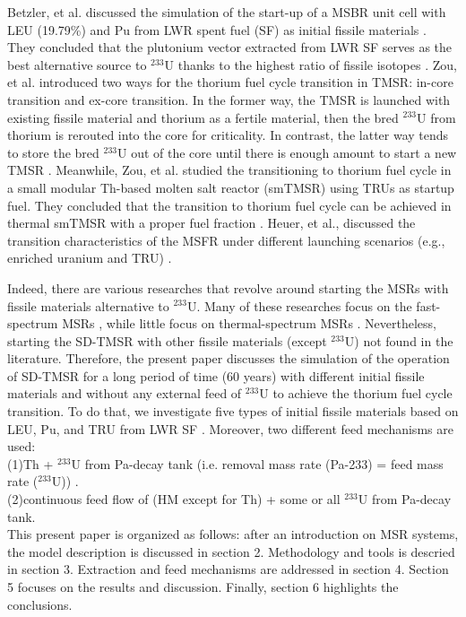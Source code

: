 Betzler, et al. discussed the simulation of the start-up of a MSBR unit cell with LEU (19.79\%) and Pu from \gls{LWR} spent fuel (SF) as initial fissile materials \cite{betzler2016modeling}. They concluded that the plutonium vector extracted from LWR SF serves as the best alternative source to $^{233}$U thanks to the highest ratio of fissile isotopes \cite{betzler2016modeling}. Zou, et al. introduced two ways for the thorium fuel cycle transition in \gls{TMSR}: in-core transition and ex-core transition. In the former way, the TMSR is launched with existing fissile material and thorium as a fertile material, then the bred $^{233}$U from thorium is rerouted into the core for criticality. In contrast, the latter way tends to store the bred $^{233}$U out of the core until there is enough amount to start a new TMSR \cite{zou2018transition}.
Meanwhile, Zou, et al. studied the transitioning to thorium fuel cycle in a small modular Th-based molten salt reactor (smTMSR) using TRUs as startup fuel. They concluded that the transition to thorium fuel cycle can be achieved in thermal smTMSR with a proper fuel fraction \cite{zou2018preliminary}.
Heuer, et al., discussed the transition characteristics of the \gls{MSFR} under different launching scenarios (e.g., enriched uranium and TRU) \cite{heuer2014towards}.

Indeed, there are various researches that revolve around starting the MSRs with fissile materials alternative to $^{233}$U. Many of these researches focus on the fast-spectrum MSRs \cite{ashraf2019modeling,ashraf2018nuclear,heuer2014towards,fiorina2013investigation}, while little focus on thermal-spectrum MSRs \cite{betzler2016modeling,zou2018preliminary,zou2018transition}. Nevertheless, starting the \gls{SD-TMSR} with other fissile materials (except $^{233}$U) not found in the literature. Therefore, the present paper discusses the simulation of the operation of \gls{SD-TMSR} for a long period of time (60 years) with different initial fissile materials and without any external feed of $^{233}$U to achieve the thorium fuel cycle transition. To do that, we investigate five types of initial fissile materials based on \gls{LEU}, Pu, and \gls{TRU} from LWR SF \cite{de2000scenarios}. Moreover, two different feed mechanisms are used: \\
(1)Th + $^{233}$U from Pa-decay tank (i.e. removal mass rate (Pa-233) = feed mass rate ($^{233}$U)) \cite{betzler2016modeling}.\\
(2)continuous feed flow of (HM except for Th) + some or all $^{233}$U from Pa-decay tank.\\
This present paper is organized as follows: after an introduction on \gls{MSR} systems, the model description is discussed in section 2. Methodology and tools is descried in section 3. Extraction and feed mechanisms are addressed in section 4. Section 5 focuses on the results and discussion. Finally, section 6 highlights the conclusions.

